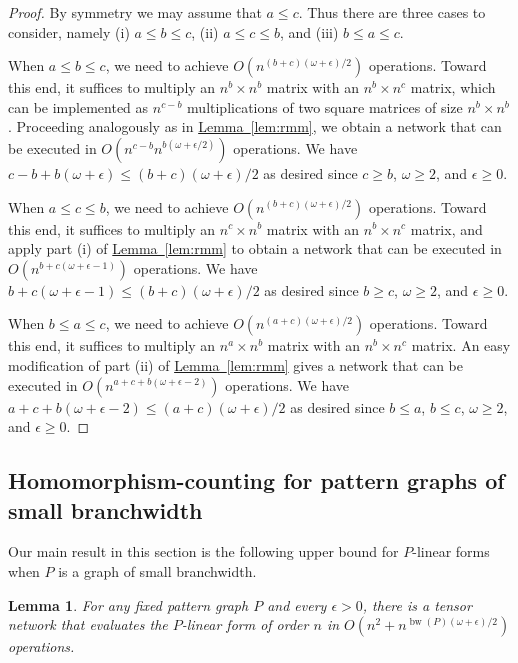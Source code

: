 \documentclass[11pt]{article}
\numberwithin{equation}{section}
\newtheorem{lemma}[theorem]{Lemma}
\theoremstyle{definition}
\theoremstyle{plain}
\newcommand{\expref}[2]{\hyperref[#2]{#1~\ref{#2}}}
\DeclareMathOperator{\bw}{bw}
\begin{document}
\begin{proof}
By symmetry we may assume that $a\leq c$. Thus there are three cases
to consider, namely (i) $a\leq b\leq c$, (ii) $a\leq c\leq b$, and
(iii) $b\leq a\leq c$.

When $a\leq b\leq c$, we need to achieve $O(n^{(b+c)(\omega+\epsilon)/2})$
operations. Toward this end, it suffices to multiply an $n^b\times n^b$ matrix
with an $n^b\times n^c$ matrix, which can be implemented as $n^{c-b}$
multiplications of two square matrices of size $n^b\times n^b$.
Proceeding analogously as in \expref{Lemma}{lem:rmm}, we obtain a network that
can be executed in $O(n^{c-b}n^{b(\omega+\epsilon/2)})$ operations.
We have $c-b+b(\omega+\epsilon)\leq (b+c)(\omega+\epsilon)/2$ as desired
since $c\geq b$, $\omega\geq 2$, and $\epsilon\geq 0$.

When $a\leq c\leq b$, we need to achieve $O(n^{(b+c)(\omega+\epsilon)/2})$
operations. Toward this end, it suffices to multiply an $n^c\times n^b$ matrix
with an $n^b\times n^c$ matrix, and apply part (i) of \expref{Lemma}{lem:rmm} to obtain
a network that can be executed in $O(n^{b+c(\omega+\epsilon-1)})$ operations.
We have $b+c(\omega+\epsilon-1)\leq (b+c)(\omega+\epsilon)/2$ as desired
since $b\geq c$, $\omega\geq 2$, and $\epsilon\geq 0$.

When $b\leq a\leq c$, we need to achieve $O(n^{(a+c)(\omega+\epsilon)/2})$
operations. Toward this end, it suffices to multiply an $n^a\times n^b$ matrix
with an $n^b\times n^c$ matrix. An easy modification of part (ii) of
\expref{Lemma}{lem:rmm} gives a network that can be executed in
$O(n^{a+c+b(\omega+\epsilon-2)})$ operations.
We have $a+c+b(\omega+\epsilon-2)\leq (a+c)(\omega+\epsilon)/2$ as desired
since $b\leq a$, $b\leq c$, $\omega\geq 2$, and $\epsilon\geq 0$.
\end{proof}


\subsection{Homomorphism-counting for pattern graphs of small branchwidth}

Our main result in this section is the following upper bound for $P$-linear forms when $P$ is a graph
of small branchwidth.

\begin{lemma}
  \label{lem:branchwidth ub}
  For any fixed pattern graph $P$ and every $\epsilon > 0$, there is a tensor network that evaluates the $P$-linear form of order $n$
  in $O(n^2 + n^{\bw(P) (\omega + \epsilon) / 2})$ operations.
\end{lemma}
\end{document}
